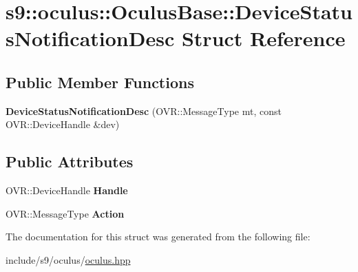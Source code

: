 \hypertarget{structs9_1_1oculus_1_1OculusBase_1_1DeviceStatusNotificationDesc}{\section{s9\-:\-:oculus\-:\-:Oculus\-Base\-:\-:Device\-Status\-Notification\-Desc Struct Reference}
\label{structs9_1_1oculus_1_1OculusBase_1_1DeviceStatusNotificationDesc}
}
\subsection*{Public Member Functions}
\begin{DoxyCompactItemize}
\item 
\hypertarget{structs9_1_1oculus_1_1OculusBase_1_1DeviceStatusNotificationDesc_ab9ba774f4572708770ad28dfafeb84dc}{{\bfseries Device\-Status\-Notification\-Desc} (O\-V\-R\-::\-Message\-Type mt, const O\-V\-R\-::\-Device\-Handle \&dev)}\label{structs9_1_1oculus_1_1OculusBase_1_1DeviceStatusNotificationDesc_ab9ba774f4572708770ad28dfafeb84dc}

\end{DoxyCompactItemize}
\subsection*{Public Attributes}
\begin{DoxyCompactItemize}
\item 
\hypertarget{structs9_1_1oculus_1_1OculusBase_1_1DeviceStatusNotificationDesc_a64c6d955e46160eb5e0b31e5cd769b22}{O\-V\-R\-::\-Device\-Handle {\bfseries Handle}}\label{structs9_1_1oculus_1_1OculusBase_1_1DeviceStatusNotificationDesc_a64c6d955e46160eb5e0b31e5cd769b22}

\item 
\hypertarget{structs9_1_1oculus_1_1OculusBase_1_1DeviceStatusNotificationDesc_a2a4e88e7c6ff451ee9cb6f6212509923}{O\-V\-R\-::\-Message\-Type {\bfseries Action}}\label{structs9_1_1oculus_1_1OculusBase_1_1DeviceStatusNotificationDesc_a2a4e88e7c6ff451ee9cb6f6212509923}

\end{DoxyCompactItemize}


The documentation for this struct was generated from the following file\-:\begin{DoxyCompactItemize}
\item 
include/s9/oculus/\hyperlink{oculus_8hpp}{oculus.\-hpp}\end{DoxyCompactItemize}
